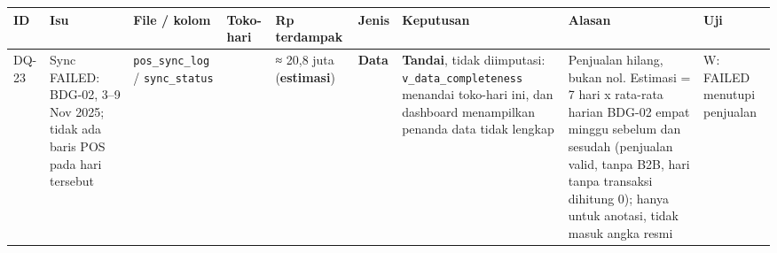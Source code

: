 \documentclass[10pt,a4paper]{article}
\begin{document}
{\def\LTcaptype{none} %
\begin{longtable}[]{@{}
  >{\raggedright\arraybackslash}p{}
  >{\raggedright\arraybackslash}p{}
  >{\raggedright\arraybackslash}p{}
  >{\raggedleft\arraybackslash}p{}
  >{\raggedleft\arraybackslash}p{}
  >{\raggedright\arraybackslash}p{}
  >{\raggedright\arraybackslash}p{}
  >{\raggedright\arraybackslash}p{}
  >{\raggedright\arraybackslash}p{}@{}}
\toprule\noalign{}
\begin{minipage}[b]{\linewidth}\raggedright
ID
\end{minipage} & \begin{minipage}[b]{\linewidth}\raggedright
Isu
\end{minipage} & \begin{minipage}[b]{\linewidth}\raggedright
File / kolom
\end{minipage} & \begin{minipage}[b]{\linewidth}\raggedleft
Toko-hari
\end{minipage} & \begin{minipage}[b]{\linewidth}\raggedleft
Rp terdampak
\end{minipage} & \begin{minipage}[b]{\linewidth}\raggedright
Jenis
\end{minipage} & \begin{minipage}[b]{\linewidth}\raggedright
Keputusan
\end{minipage} & \begin{minipage}[b]{\linewidth}\raggedright
Alasan
\end{minipage} & \begin{minipage}[b]{\linewidth}\raggedright
Uji
\end{minipage} \\
\midrule\noalign{}
\endhead
\bottomrule\noalign{}
\endlastfoot
DQ-23 & Sync FAILED: BDG-02, 3--9 Nov 2025; tidak ada baris POS pada hari tersebut & \texttt{pos\_\allowbreak{}sync\_\allowbreak{}log} / \texttt{sync\_\allowbreak{}status} & 7 & ≈ 20,8 juta (\textbf{estimasi}) & \textbf{Data} & \textbf{Tandai}, tidak diimputasi: \texttt{v\_\allowbreak{}data\_\allowbreak{}completeness} menandai toko-hari ini, dan dashboard menampilkan penanda data tidak lengkap & Penjualan hilang, bukan nol. Estimasi = 7 hari x rata-rata harian BDG-02 empat minggu sebelum dan sesudah (penjualan valid, tanpa B2B, hari tanpa transaksi dihitung 0); hanya untuk anotasi, tidak masuk angka resmi & W: FAILED menutupi penjualan \\

\end{longtable}}
\end{document}
